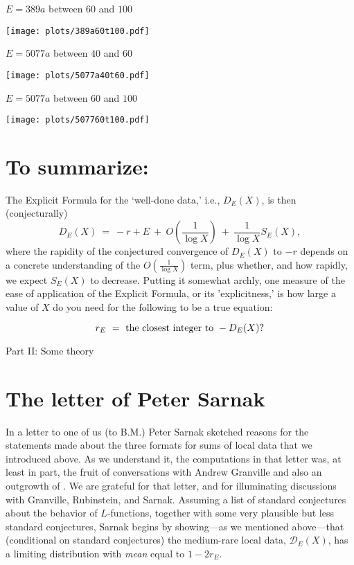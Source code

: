 \documentclass[11pt]{article}
\theoremstyle{plain}
\theoremstyle{definition}
\numberwithin{equation}{section}
\numberwithin{figure}{section}
\numberwithin{table}{section}
\begin{document}
   \centerline{ $E = 389a$  between $60$ and $100$}
   \vskip10pt
 \hskip100pt \texttt{[image: plots/389a60t100.pdf]}
\newpage
  \centerline{ $E = 5077a$  between $40$ and $60$}
   \vskip10pt
 \hskip100pt \texttt{[image: plots/5077a40t60.pdf]}

   \centerline{ $E = 5077a$  between $60$ and $100$}
   \vskip10pt
 \hskip100pt \texttt{[image: plots/507760t100.pdf]}


  \section{ To summarize:}  The  Explicit Formula for the `well-done data,' i.e., ${D}_E(X)$,  is then (conjecturally)
   $${D}_E(X)\ = \ -r+E \ +\ O( {\frac{1}{\log X}})\  +\  {\frac{1}{\log X}}S_E(X),$$
   where the rapidity of the conjectured convergence of ${D}_E(X)$ to $-r$ depends on a concrete understanding of the $O( {\frac{1}{\log X}})$ term, plus whether, and how rapidly, we expect  $S_E(X)$ to decrease. Putting it somewhat archly, one measure of the ease of application of  the Explicit Formula, or its 'explicitness,' is how large a value of $X$ do  you need for the following to be a true equation:

   $$r_E \ = \ {\rm the\ closest\ integer\ to \ }- {D}_E(X)?$$


   \vskip40pt
 \centerline{ \Large{ Part II: Some  theory}}
  \vskip30pt


    \section{The letter of Peter Sarnak}  In a letter  \cite{S}  to one of us (to B.M.) Peter Sarnak sketched reasons for the statements made about the three formats for sums of local data that we  introduced above. As we  understand it, the computations in that letter was, at least in part, the fruit of conversations with Andrew Granville and also an outgrowth of \cite{R-S}. We are grateful for that letter, and for  illuminating discussions with    Granville, Rubinstein, and Sarnak.  Assuming a list of standard conjectures about the behavior of $L$-functions, together with some very plausible but less standard conjectures, Sarnak begins by showing---as we mentioned above---that (conditional on standard conjectures) the medium-rare local data,  ${\mathcal D}_E(X)$, has a limiting distribution with {\it mean} equal to $1- 2r_E$.
\end{document}
